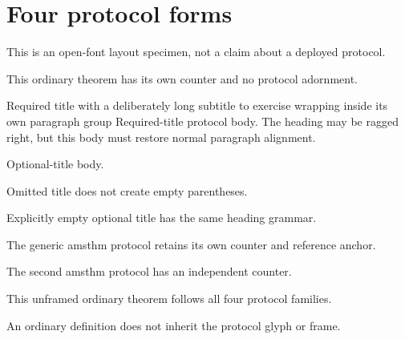 \section{Four protocol forms}
This is an open-font layout specimen, not a claim about a deployed protocol.
\begin{theorem}\label{fixture:before}
This ordinary theorem has its own counter and no protocol adornment.
\end{theorem}
\protocolsavestate
\begin{lsprotocol}{Required title with a deliberately long subtitle to exercise wrapping inside its own paragraph group}
\label{fixture:ls}
\protocolbodyparagraph
Required-title protocol body. The heading may be ragged right, but this body
must restore normal paragraph alignment.
\makeatletter
\edef\protocolbodyright{\the\rightskip}
\ifx\protocolsavedright\protocolbodyright\else
  \PackageError{protocol-fixture}{Heading alignment leaked into body}{}\fi
\makeatother
\end{lsprotocol}
\protocolcheckstate
{}
\begin{stpprotocol}\label{fixture:stp}
\protocolbodyparagraph
Optional-title body.
\end{stpprotocol}
\protocolcheckstate
\begin{stpprotocol}\label{fixture:stp-none}
\protocolbodyparagraph
Omitted title does not create empty parentheses.
\end{stpprotocol}
\protocolcheckstate
\begin{stpprotocol}[]\label{fixture:stp-empty}
\protocolbodyparagraph
Explicitly empty optional title has the same heading grammar.
\end{stpprotocol}
\protocolcheckstate
\begin{protocol}\label{fixture:generic}
\protocolbodyparagraph
The generic amsthm protocol retains its own counter and reference anchor.
\end{protocol}
\protocolcheckstate
\begin{heprotocol}\label{fixture:he}
\protocolbodyparagraph
The second amsthm protocol has an independent counter.
\end{heprotocol}
\protocolcheckstate
{}
\begin{theorem}\label{fixture:after}
This unframed ordinary theorem follows all four protocol families.
\end{theorem}
\begin{definition}\label{fixture:definition}
An ordinary definition does not inherit the protocol glyph or frame.
\end{definition}
